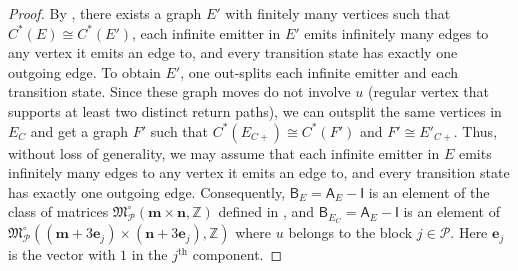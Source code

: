 \documentclass[12pt]{amsbook}%
\theoremstyle{defin}
\theoremstyle{remark}
\numberwithin{equation}{chapter}
\numberwithin{theor}{section}
\newcommand{\ZZ}{\mathbb{Z}}
\begin{document}
\begin{proof}
By \cite[Lemma~3.17]{segrerapws:gcgcfg}, there exists a graph $E'$ with finitely many vertices such that $C^*(E) \cong C^*(E')$, each infinite emitter in $E'$ emits infinitely many edges to any vertex it emits an edge to, and every transition state has exactly one outgoing edge.  To obtain $E'$, one out-splits each infinite emitter and each transition state.  Since these graph moves do not involve $u$ (regular vertex that supports at least two distinct return paths), we can outsplit the same vertices in $E_{C}$ and get a graph $F'$ such that $C^*( E_{ C+} ) \cong C^*(F')$ and $F' \cong E'_{ C+ }$.  Thus, without loss of generality, we may assume that each infinite emitter in $E$ emits infinitely many edges to any vertex it emits an edge to, and every transition state has exactly one outgoing edge.  Consequently, $\mathsf{B}_E = \mathsf{A}_E - \mathsf{I}$ is an element of the class of matrices $\mathfrak{M}_{\mathcal{P}}^\circ ( \mathbf{m} \times \mathbf{n} , \ZZ )$ defined in \cite[Definition~4.15]{segrerapws:gcgcfg}, and $\mathsf{B}_{E_{C}} =  \mathsf{A}_E - \mathsf{I}$ is an element of $\mathfrak{M}_{\mathcal{P}}^\circ ( ( \mathbf{m} + 3 \mathbf{e}_j) \times (\mathbf{n} + 3 \mathbf{e}_j ) , \ZZ )$ where $u$ belongs to the block $j \in \mathcal{P}$. Here $\mathbf{e}_j$ is the vector with $1$ in the $j^{\text{th}}$ component.


\end{proof}
\end{document}
